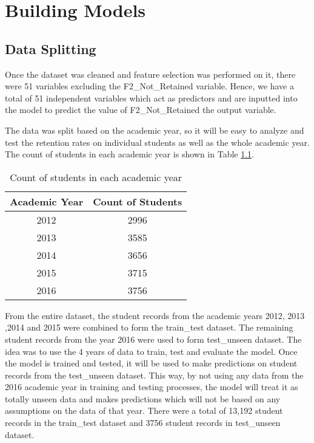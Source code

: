 \documentclass[11pt,openright]{report}
\begin{document}
\chapter{Building Models} \label{chapter:building_models}

\section {Data Splitting }

Once the dataset was cleaned and feature selection was performed on it, there were 51 variables excluding the F2\_Not\_Retained variable. Hence, we have a total of 51 independent variables which act as predictors and are inputted into the model to predict the value of F2\_Not\_Retained the output variable. 

The data was split based on the academic year, so it will be easy to analyze and test the retention rates on individual students as well as the whole academic year. The count of students in each academic year is shown in Table \ref{table:acad_db}.

\begin{table}[!htbp]
	\renewcommand{\arraystretch}{1.3}
	\caption{Count of students in each academic year}
	\label{table:acad_db}
	\centering
	\begin{tabular}{|c|c|}
    \hline
    \bfseries Academic Year & \bfseries Count of Students \\ 
    \hline
  	2012 &  2996 \\ \hline
	2013 & 3585 \\ \hline
	2014 & 3656 \\ \hline
	2015 & 3715 \\ \hline
	2016 & 3756 \\ \hline
\end{tabular} 
\end{table}

From the entire dataset, the student records from the academic years 2012, 2013 ,2014 and 2015 were combined to form the train\_test dataset. The remaining student records from the year 2016 were used to form test\_unseen dataset. The idea was to use the 4 years of data to train, test and evaluate the model. Once the model is trained and tested, it will be used to make predictions on student records from the test\_unseen dataset. This way, by not using any data from the 2016 academic year in training and testing processes, the model will treat it as totally unseen data and makes predictions which will not be based on any assumptions on the data of that year. There were a total of 13,192 student records in the train\_test dataset and 3756 student records in test\_unseen dataset.
\end{document}
